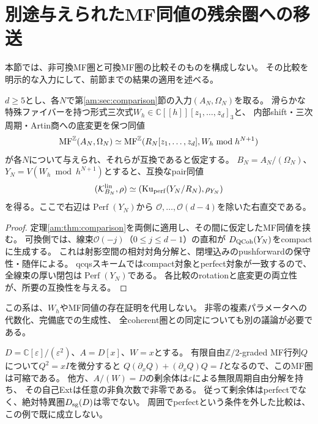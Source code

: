 \section{別途与えられたMF同値の残余圏への移送}\label{ar:sec:application}

本節では、非可換MF圏と可換MF圏の比較そのものを構成しない。
その比較を明示的な入力にして、前節までの結果の適用を述べる。

\begin{corollary}[互換なMF比較が与えられた場合]\label{ar:cor:conditional}
$d\ge5$とし、各$N$で第\ref{am:sec:comparison}節の入力$(A_N,\Omega_N)$を取る。
滑らかな特殊ファイバーを持つ形式三次式$W_h\in\mathbb C[[h]][z_1,\ldots,z_d]_3$と、
内部shift・三次周期・Artin商への底変更を保つ同値
\[
 \operatorname{MF}^{\mathbb Z}(A_N,\Omega_N)\simeq
 \operatorname{MF}^{\mathbb Z}(R_N[z_1,\ldots,z_d],W_h\bmod h^{N+1})
\]
が各$N$について与えられ、それらが互換であると仮定する。
$B_N=A_N/(\Omega_N)$、$Y_N=V(W_h\bmod h^{N+1})$とすると、互換なpair同値
\[
 (\mathcal K_{B_N}^{\rm lin},\rho)\simeq
 (\operatorname{Ku}_{\rm perf}(Y_N/R_N),\rho_{Y_N})
\]
を得る。ここで右辺は$\operatorname{Perf}(Y_N)$から
$\mathcal O,\ldots,\mathcal O(d-4)$を除いた右直交である。
\end{corollary}
\begin{proof}
定理\ref{am:thm:comparison}を両側に適用し、その間に仮定したMF同値を挟む。
可換側では、線束$\mathcal O(-j)$（$0\le j\le d-1$）の直和が
$D_{\rm QCoh}(Y_N)$をcompactに生成する\cite[Tag~0BQT]{AMStacks}。
これは射影空間の相対対角分解と、閉埋込みのpushforwardの保守性・随伴による。
qcqsスキームではcompact対象とperfect対象が一致する\cite[Tag~09M1]{AMStacks}ので、
全線束の厚い閉包は$\operatorname{Perf}(Y_N)$である。
各比較のrotationと底変更の両立性が、所要の互換性を与える。
\end{proof}

この系は、$W_h$やMF同値の存在証明を代用しない。
非零の複素パラメータへの代数化、完備底での生成性、
全coherent圏との同定についても別の議論が必要である。

\begin{example}[絶対特異圏を代用できない理由]\label{cg:ex:artin-singularity}
$D=\mathbb C[\varepsilon]/(\varepsilon^2)$、$A=D[x]$、$W=x$とする。
有限自由$\mathbb Z/2$-graded MF行列$Q$について$Q^2=xI$を微分すると
$Q(\partial_xQ)+(\partial_xQ)Q=I$となるので、このMF圏は可縮である。
他方、$A/(W)=D$の剰余体は$\varepsilon$による無限周期自由分解を持ち、
その自己Extは任意の非負次数で非零である。
従って剰余体はperfectでなく、絶対特異圏$D_{\rm sg}(D)$は零でない。
周囲でperfectという条件を外した比較は、この例で既に成立しない。
\end{example}
